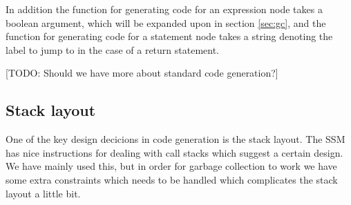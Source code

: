 \documentclass{scrartcl}
\begin{document}
In addition the function for generating code for an expression node
takes a boolean argument, which will be expanded upon in section
\ref{sec:gc}, and the function for generating code for a statement
node takes a string denoting the label to jump to in the case of a 
return statement.

[TODO: Should we have more about standard code generation?]

\subsection{Stack layout}
One of the key design decicions in code generation is the stack
layout. The SSM has nice instructions for dealing with call stacks
which suggest a certain design. We have mainly used this, but in
order for garbage collection to work we have some extra constraints 
which needs to be handled which complicates the stack layout a little
bit.
\end{document}
